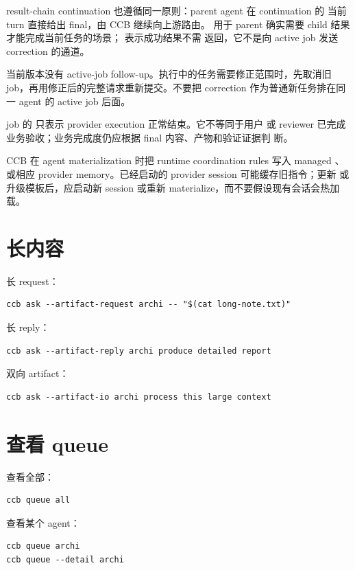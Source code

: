 result-chain continuation 也遵循同一原则：parent agent 在 continuation 的
当前 turn 直接给出 final，由 CCB 继续向上游路由。 用于 parent
确实需要 child 结果才能完成当前任务的场景； 表示成功结果不需
返回，它不是向 active job 发送 correction 的通道。

当前版本没有 active-job follow-up。执行中的任务需要修正范围时，先取消旧
job，再用修正后的完整请求重新提交。不要把 correction 作为普通新任务排在同
一 agent 的 active job 后面。

job 的  只表示 provider execution 正常结束。它不等同于用户
或 reviewer 已完成业务验收；业务完成度仍应根据 final 内容、产物和验证证据判
断。

CCB 在 agent materialization 时把 runtime coordination rules 写入 managed
、 或相应 provider memory。已经启动的 provider
session 可能缓存旧指令；更新  或升级模板后，应启动新
session 或重新 materialize，而不要假设现有会话会热加载。

\section{长内容}

长 request：

\begin{lstlisting}
ccb ask --artifact-request archi -- "$(cat long-note.txt)"
\end{lstlisting}

长 reply：

\begin{lstlisting}
ccb ask --artifact-reply archi produce detailed report
\end{lstlisting}

双向 artifact：

\begin{lstlisting}
ccb ask --artifact-io archi process this large context
\end{lstlisting}

\section{查看 queue}

查看全部：

\begin{lstlisting}
ccb queue all
\end{lstlisting}

查看某个 agent：

\begin{lstlisting}
ccb queue archi
ccb queue --detail archi
\end{lstlisting}

